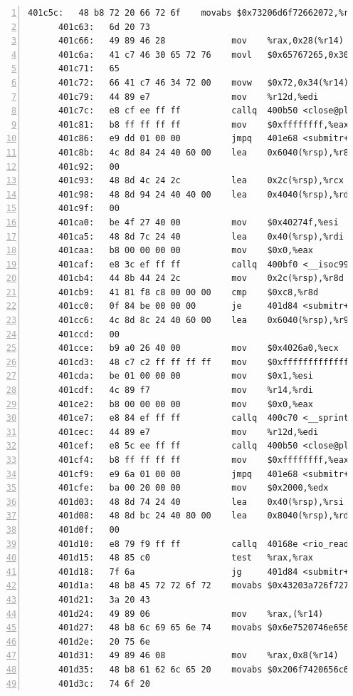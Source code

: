 \documentclass{article}
\begin{document}
\begin{lstlisting}[title = bomb的反汇编代码及部分注释, xleftmargin = 2em,xrightmargin = 2em, aboveskip = 1em, numbers = left, basicstyle=\scriptsize\ttfamily, numberstyle=\scriptsize]
      401c5c:	48 b8 72 20 66 72 6f 	movabs $0x73206d6f72662072,%rax
      401c63:	6d 20 73 
      401c66:	49 89 46 28          	mov    %rax,0x28(%r14)
      401c6a:	41 c7 46 30 65 72 76 	movl   $0x65767265,0x30(%r14)
      401c71:	65 
      401c72:	66 41 c7 46 34 72 00 	movw   $0x72,0x34(%r14)
      401c79:	44 89 e7             	mov    %r12d,%edi
      401c7c:	e8 cf ee ff ff       	callq  400b50 <close@plt>
      401c81:	b8 ff ff ff ff       	mov    $0xffffffff,%eax
      401c86:	e9 dd 01 00 00       	jmpq   401e68 <submitr+0x6bc>
      401c8b:	4c 8d 84 24 40 60 00 	lea    0x6040(%rsp),%r8
      401c92:	00 
      401c93:	48 8d 4c 24 2c       	lea    0x2c(%rsp),%rcx
      401c98:	48 8d 94 24 40 40 00 	lea    0x4040(%rsp),%rdx
      401c9f:	00 
      401ca0:	be 4f 27 40 00       	mov    $0x40274f,%esi
      401ca5:	48 8d 7c 24 40       	lea    0x40(%rsp),%rdi
      401caa:	b8 00 00 00 00       	mov    $0x0,%eax
      401caf:	e8 3c ef ff ff       	callq  400bf0 <__isoc99_sscanf@plt>
      401cb4:	44 8b 44 24 2c       	mov    0x2c(%rsp),%r8d
      401cb9:	41 81 f8 c8 00 00 00 	cmp    $0xc8,%r8d
      401cc0:	0f 84 be 00 00 00    	je     401d84 <submitr+0x5d8>
      401cc6:	4c 8d 8c 24 40 60 00 	lea    0x6040(%rsp),%r9
      401ccd:	00 
      401cce:	b9 a0 26 40 00       	mov    $0x4026a0,%ecx
      401cd3:	48 c7 c2 ff ff ff ff 	mov    $0xffffffffffffffff,%rdx
      401cda:	be 01 00 00 00       	mov    $0x1,%esi
      401cdf:	4c 89 f7             	mov    %r14,%rdi
      401ce2:	b8 00 00 00 00       	mov    $0x0,%eax
      401ce7:	e8 84 ef ff ff       	callq  400c70 <__sprintf_chk@plt>
      401cec:	44 89 e7             	mov    %r12d,%edi
      401cef:	e8 5c ee ff ff       	callq  400b50 <close@plt>
      401cf4:	b8 ff ff ff ff       	mov    $0xffffffff,%eax
      401cf9:	e9 6a 01 00 00       	jmpq   401e68 <submitr+0x6bc>
      401cfe:	ba 00 20 00 00       	mov    $0x2000,%edx
      401d03:	48 8d 74 24 40       	lea    0x40(%rsp),%rsi
      401d08:	48 8d bc 24 40 80 00 	lea    0x8040(%rsp),%rdi
      401d0f:	00 
      401d10:	e8 79 f9 ff ff       	callq  40168e <rio_readlineb>
      401d15:	48 85 c0             	test   %rax,%rax
      401d18:	7f 6a                	jg     401d84 <submitr+0x5d8>
      401d1a:	48 b8 45 72 72 6f 72 	movabs $0x43203a726f727245,%rax
      401d21:	3a 20 43 
      401d24:	49 89 06             	mov    %rax,(%r14)
      401d27:	48 b8 6c 69 65 6e 74 	movabs $0x6e7520746e65696c,%rax
      401d2e:	20 75 6e 
      401d31:	49 89 46 08          	mov    %rax,0x8(%r14)
      401d35:	48 b8 61 62 6c 65 20 	movabs $0x206f7420656c6261,%rax
      401d3c:	74 6f 20 

\end{lstlisting}
\end{document}
